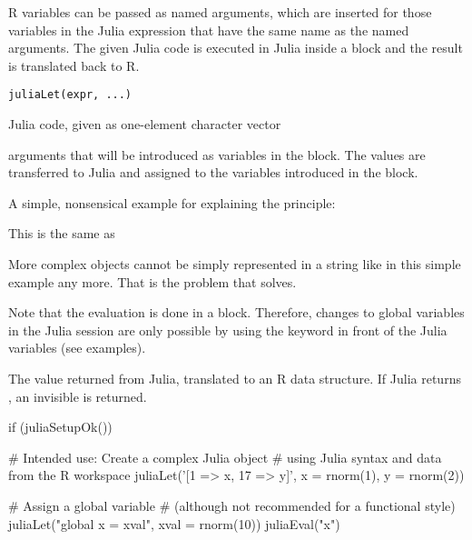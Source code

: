 %
\begin{Description}\relax
R variables can be passed as named arguments, which are inserted
for those variables in the Julia expression that have the same name
as the named arguments. The given Julia code is executed in Julia
inside a  block and the result is translated back to R.
\end{Description}
%
\begin{Usage}
\begin{verbatim}
juliaLet(expr, ...)
\end{verbatim}
\end{Usage}
%
\begin{Arguments}
\begin{ldescription}
\item[\code{expr}] Julia code, given as one-element character vector

\item[\code{...}] arguments that will be introduced as variables in the
 block. The values are transferred to Julia and
assigned to the variables introduced in the  block.
\end{ldescription}
\end{Arguments}
%
\begin{Details}\relax
A simple, nonsensical example for explaining the principle:


This is the same as


More complex objects cannot be simply represented in a string like in
this simple example any more.
That is the problem that  solves.

Note that the evaluation is done in a  block. Therefore,
changes to global variables in the Julia session are only possible by
using the keyword  in front of the Julia variables
(see examples).
\end{Details}
%
\begin{Value}
The value returned from Julia, translated to an R data structure.
If Julia returns , an invisible  is returned.
\end{Value}
%
\begin{Examples}
\begin{ExampleCode}
if (juliaSetupOk()) {

   # Intended use: Create a complex Julia object
   # using Julia syntax and data from the R workspace
   juliaLet('[1 => x, 17 => y]', x = rnorm(1), y = rnorm(2))

   # Assign a global variable
   # (although not recommended for a functional style)
   juliaLet("global x = xval", xval = rnorm(10))
   juliaEval("x")

}


\end{ExampleCode}
\end{Examples}
